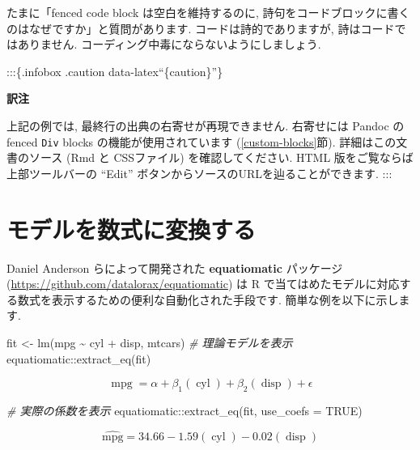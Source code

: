 \documentclass[
  11pt,
  lualatex,
  ja=standard]{bxjsreport}
\newenvironment{Shaded}{\begin{snugshade}}{\end{snugshade}}
\newcommand{\AttributeTok}[1]{\textcolor[rgb]{0.77,0.63,0.00}{#1}}
\newcommand{\CommentTok}[1]{\textcolor[rgb]{0.56,0.35,0.01}{\textit{#1}}}
\newcommand{\ConstantTok}[1]{\textcolor[rgb]{0.00,0.00,0.00}{#1}}
\newcommand{\FunctionTok}[1]{\textcolor[rgb]{0.00,0.00,0.00}{#1}}
\newcommand{\NormalTok}[1]{#1}
\newcommand{\OtherTok}[1]{\textcolor[rgb]{0.56,0.35,0.01}{#1}}
\newcommand{\SpecialCharTok}[1]{\textcolor[rgb]{0.00,0.00,0.00}{#1}}
\begin{document}
たまに「fenced code block は空白を維持するのに, 詩句をコードブロックに書くのはなぜですか」と質問があります. コードは詩的でありますが, 詩はコードではありません. コーディング中毒にならないようにしましょう.

:::\{.infobox .caution data-latex``\{caution\}''\}

\textbf{訳注}

上記の例では, 最終行の出典の右寄せが再現できません. 右寄せには Pandoc の fenced \texttt{Div} blocks の機能が使用されています (\ref{custom-blocks}節). 詳細はこの文書のソース (Rmd と CSSファイル) を確認してください. HTML 版をご覧ならば上部ツールバーの ``Edit'' ボタンからソースのURLを辿ることができます. :::

\hypertarget{equatiomatic}{%
\section{モデルを数式に変換する}\label{equatiomatic}}

Daniel Anderson らによって開発された \textbf{equatiomatic} パッケージ \autocite{R-equatiomatic} (\url{https://github.com/datalorax/equatiomatic}) は R で当てはめたモデルに対応する数式を表示するための便利な自動化された手段です. 簡単な例を以下に示します.

\begin{Shaded}
\begin{Highlighting}[numbers=left,,]
\NormalTok{fit }\OtherTok{\textless{}{-}} \FunctionTok{lm}\NormalTok{(mpg }\SpecialCharTok{\textasciitilde{}}\NormalTok{ cyl }\SpecialCharTok{+}\NormalTok{ disp, mtcars)}
\CommentTok{\# 理論モデルを表示}
\NormalTok{equatiomatic}\SpecialCharTok{::}\FunctionTok{extract\_eq}\NormalTok{(fit)}
\end{Highlighting}
\end{Shaded}

\[
\operatorname{mpg} = \alpha + \beta_{1}(\operatorname{cyl}) + \beta_{2}(\operatorname{disp}) + \epsilon
\]

\begin{Shaded}
\begin{Highlighting}[numbers=left,,]
\CommentTok{\# 実際の係数を表示}
\NormalTok{equatiomatic}\SpecialCharTok{::}\FunctionTok{extract\_eq}\NormalTok{(fit, }\AttributeTok{use\_coefs =} \ConstantTok{TRUE}\NormalTok{)}
\end{Highlighting}
\end{Shaded}

\[
\operatorname{\widehat{mpg}} = 34.66 - 1.59(\operatorname{cyl}) - 0.02(\operatorname{disp})
\]
\end{document}

